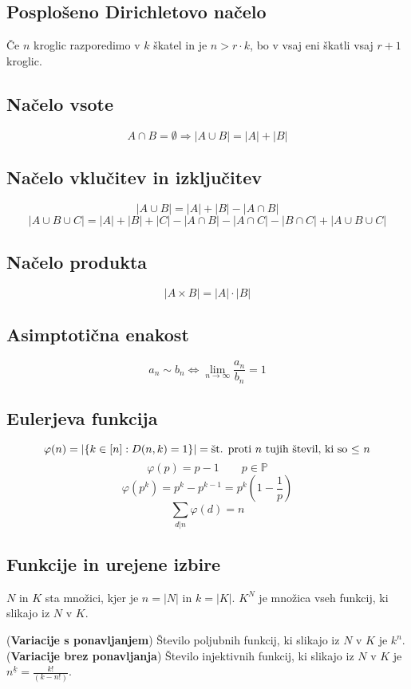 \documentclass[11pt,a4paper]{article}
\begin{document}
\subsection*{Posplošeno Dirichletovo načelo}
Če $n$ kroglic razporedimo v $k$ škatel in je $n>r \cdot k$, bo v vsaj eni škatli vsaj $r+1$ kroglic.

\subsection*{Načelo vsote}
\[ A\cap B = \emptyset \Rightarrow |A \cup B| = |A| + |B| \]

\subsection*{Načelo vklučitev in izključitev}
\[ |A \cup B| = |A| + |B| - |A \cap B| \]
\[ |A \cup B \cup C| = |A| + |B| + |C| - |A \cap B| - |A \cap C| - |B \cap C| + |A \cup B \cup C|\]

\subsection*{Načelo produkta}
\[ |A \times B| = |A| \cdot |B| \]

\subsection*{Asimptotična enakost}
\[a_n \sim b_n \Leftrightarrow \lim_{n \to \infty} \frac{a_n}{b_n} = 1\]

\subsection*{Eulerjeva funkcija}
\[ \varphi (n) = |\{k\in [n] : D(n,k) = 1 \}| = \textmd{št. proti $n$ tujih števil, ki so $\leq$ $n$}\]
\[\varphi(p) = p-1 \qquad p \in \mathbb{P}\]
\[ \varphi(p^k) = p^k-p^{k-1} = p^k(1-\frac{1}{p})\]
\[\sum_{d|n} \varphi(d) = n\]

\subsection*{Funkcije in urejene izbire}
$N$ in $K$ sta množici, kjer je $n = |N|$ in $k = |K|$. $K^N$ je množica vseh funkcij, ki slikajo iz $N$ v $K$.

(\textbf{Variacije s ponavljanjem}) Število poljubnih funkcij, ki slikajo iz $N$ v $K$ je $k^n$.
(\textbf{Variacije brez ponavljanja}) Število injektivnih funkcij, ki slikajo iz $N$ v $K$ je $n^{\underline{k}} = \frac{k!}{(k-n!)} $.
\end{document}
